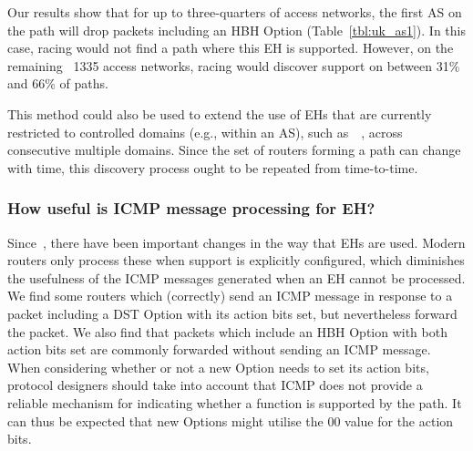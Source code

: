 \documentclass[conference]{IEEEtran}
\begin{document}
Our results show that for up to three-quarters of access networks, the first AS on the path will drop packets including an HBH Option (Table~\ref{tbl:uk_as1}). In this case, racing would not find a path where this EH is supported. However, on the remaining ~1335 access networks, racing would discover support on between 31\% and 66\% of paths.

This method could also be used to extend the use of EHs that are currently restricted to controlled domains (e.g., within an AS), such as~\cite{rfc8250}~\cite{ietf-ippm-ioam-ipv6-options-12}, across consecutive multiple domains.
Since the set of routers forming a path can change with time, this discovery process ought to be repeated from time-to-time. 

\subsubsection{ How useful is ICMP message processing for EH?}

Since~\cite{rfc2460}, there have been important changes in the way that EHs are used. Modern routers only process these when support is explicitly configured, which diminishes the usefulness of the ICMP messages generated when an EH cannot be processed. 
We find some routers which (correctly) send an ICMP message in response to a packet including a DST Option with its action bits set, but nevertheless forward the packet. We also find that packets which include an HBH Option with both action bits set are commonly forwarded without sending an ICMP message. When considering whether or not a new Option needs to set its action bits, protocol designers should take into account that ICMP does not provide a reliable mechanism for indicating whether a function is supported by the path.
It can thus be expected that new Options might utilise the 00 value for the action bits.

\end{document}
